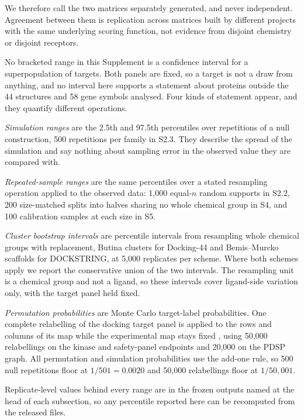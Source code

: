 We therefore call the two matrices separately generated, and never independent. Agreement
between them is replication across matrices built by different projects with the same
underlying scoring function, not evidence from disjoint chemistry or disjoint receptors.


No bracketed range in this Supplement is a confidence interval for a superpopulation of
targets. Both panels are fixed, so a target is not a draw from anything, and no interval here
supports a statement about proteins outside the 44 structures and 58 gene symbols analysed.
Four kinds of statement appear, and they quantify different operations.

\emph{Simulation ranges} are the 2.5th and 97.5th percentiles over repetitions of a null
construction, 500 repetitions per family in S2.3. They describe the spread of the simulation
and say nothing about sampling error in the observed value they are compared with.

\emph{Repeated-sample ranges} are the same percentiles over a stated resampling operation
applied to the observed data: 1{,}000 equal-$n$ random supports in S2.2, 200 size-matched
splits into halves sharing no whole chemical group in S4, and 100 calibration samples at each
size in S5.

\emph{Cluster bootstrap intervals} are percentile intervals from resampling whole chemical
groups with replacement, Butina clusters for Docking-44 \cite{butina1999} and Bemis--Murcko
scaffolds for DOCKSTRING, at 5{,}000 replicates per scheme. Where both schemes apply we report
the conservative union of the two intervals. The resampling unit is a chemical group and not a
ligand, so these intervals cover ligand-side variation only, with the target panel held fixed.

\emph{Permutation probabilities} are Monte Carlo target-label probabilities. One complete
relabelling of the docking target panel is applied to the rows and columns of its map while the
experimental map stays fixed \cite{hubert1976}, using 50{,}000 relabellings on the kinase and
safety-panel endpoints and 20{,}000 on the PDSP graph. All permutation and simulation
probabilities use the add-one rule, so 500 null repetitions floor at $1/501=0.0020$ and
50{,}000 relabellings floor at $1/50{,}001$.

Replicate-level values behind every range are in the frozen outputs named at the head of each
subsection, so any percentile reported here can be recomputed from the released files.
